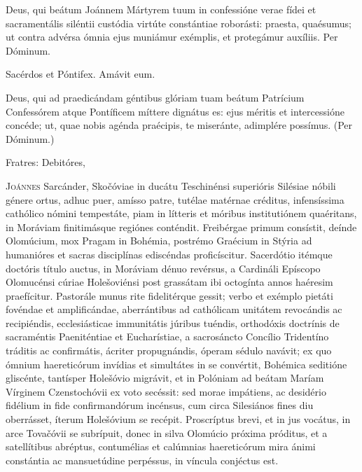 \begin{caputFesti}
\end{caputFesti}

\parsOratio
Deus, qui beátum Joánnem Mártyrem tuum
in confessióne verae fídei
et sacramentális siléntii custódia
virtúte constántiae roborásti:
praesta, quaésumus;
ut contra advérsa ómnia ejus muniámur exémplis,
et protegámur auxíliis.
Per Dóminum.

Sacérdos et Póntifex.
Amávit eum.

\parsOratio
Deus, qui ad praedicándam géntibus glóriam tuam
beátum Patrícium Confessórem atque Pontíficem
míttere dignátus es:
ejus méritis et intercessióne concéde;
ut, quae nobis agénda praécipis,
te miseránte, adimplére possímus.
(Per Dóminum.)


Fratres: Debitóres,

\horaNocturnusII


\lettrine{J}{oánnes} Sarcánder,
Skočóviae in ducátu Teschinénsi superióris Silésiae nóbili génere ortus,
adhuc puer, amísso patre, tutélae matérnae créditus,
infensíssima cathólico nómini tempestáte,
piam in lítteris et móribus institutiónem quaéritans,
in Moráviam finitimásque regiónes conténdit.
Freibérgae primum consístit, deínde Olomúcium,
mox Pragam in Bohémia, postrémo Graécium in Stýria
ad humanióres et sacras disciplínas ediscéndas proficíscitur.
Sacerdótio itémque doctóris título auctus,
in Moráviam dénuo revérsus,
a Cardináli Epíscopo Olomucénsi cúriae Holešoviénsi post grassátam
ibi octogínta annos haéresim praefícitur.
Pastorále munus rite fidelitérque gessit;
verbo et exémplo pietáti fovéndae et amplificándae,
aberrántibus ad cathólicam unitátem revocándis ac recipiéndis,
ecclesiásticae immunitátis júribus tuéndis,
orthodóxis doctrínis de sacraméntis Paeniténtiae et Eucharístiae,
a sacrosáncto Concílio Tridentíno tráditis ac confirmátis,
ácriter propugnándis, óperam sédulo navávit;
ex quo ómnium haereticórum invídias et simultátes in se convértit,
Bohémica seditióne gliscénte, tantísper Holešóvio migrávit,
et in Polóniam ad beátam Maríam Vírginem Czenstochóvii
ex voto secéssit:
sed morae impátiens, ac desidério fidélium in fide confirmandórum
incénsus, cum circa Silesiános fines diu oberrásset,
íterum Holešóvium se recépit.
Proscríptus brevi, et in jus vocátus,
in arce Tovačóvii se subrípuit,
donec in silva Olomúcio próxima próditus,
et a satellítibus abréptus,
contumélias et calúmnias haereticórum mira ánimi constántia
ac mansuetúdine perpéssus, in víncula conjéctus est.

